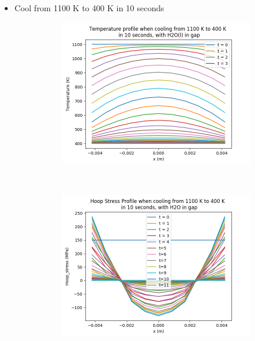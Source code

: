 \documentclass[12pt]{article}
\begin{document}
\begin{itemize}
\begin{figure}[h]
\end{figure}
\pagebreak
\item Cool from 1100 K to 400 K in 10 seconds \\
\begin{figure}[h]
    \centering
    \begin{subfigure}[b]{0.4\textwidth}
        \includegraphics[width=\textwidth]{cool_10s_H2O_T_vs_x.png}
        \caption{}
        \label{fig:t125}
    \end{subfigure}
    ~ 
    \begin{subfigure}[b]{0.4\textwidth}
        \includegraphics[width=\textwidth]{cool_10s_H2O_stress_vs_x.png}

\end{subfigure}
\end{figure}
\end{itemize}
\end{document}
